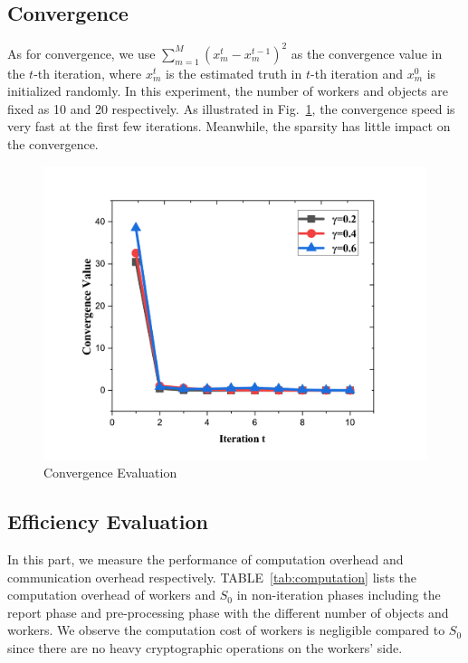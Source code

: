 \documentclass[conference]{IEEEtran}
\begin{document}
\subsection{Convergence}
As for convergence, we use $\sum\limits_{m=1}^M (x_m^t - x_m^{t-1})^2$ as the convergence value in the $t$-th iteration, where $x_m^t$ is the estimated truth in $t$-th iteration and $x_m^0$ is initialized randomly.
In this experiment, the number of workers and objects are fixed as 10 and 20 respectively.
As illustrated in Fig.~\ref{fig:conver}, the convergence speed is very fast at the first few iterations.
Meanwhile, the sparsity has little impact on the convergence.
\begin{figure}[htbp]
  \centering
  \includegraphics[width=0.60\linewidth]{figures/conver.pdf}
  \caption{Convergence Evaluation}
  \label{fig:conver}
\end{figure}

\subsection{Efficiency Evaluation}
In this part, we measure the performance of computation overhead and communication overhead respectively.
TABLE~\ref{tab:computation} lists the computation overhead of workers and $S_0$ in non-iteration phases including the report phase and pre-processing phase with the different number of objects and workers.
We observe the computation cost of workers is negligible compared to $S_0$ since there are no heavy cryptographic operations on the workers' side.
\end{document}
